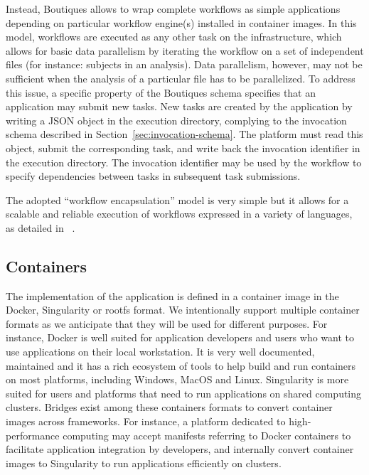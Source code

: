 \documentclass{article}
\newcommand{\todo}[2]{\pdfmargincomment[color=red,author=#1,open=true]{#2}}
\begin{document}
Instead, Boutiques allows to wrap complete workflows as simple
applications depending on particular workflow engine(s) installed in
container images. In this model, workflows are executed as any other
task on the infrastructure, which allows for basic data parallelism by
iterating the workflow on a set of independent files (for instance:
subjects in an analysis). Data parallelism, however, may not be
sufficient when the analysis of a particular file has to be
parallelized. To address this issue, a specific property of the
Boutiques schema specifies that an application may submit new
tasks. New tasks are created by the application by writing a JSON
object in the execution directory, complying to the invocation schema
described in Section~\ref{sec:invocation-schema}. The platform must
read this object, submit the corresponding task, and write back the
invocation identifier in the execution directory. The invocation
identifier may be used by the workflow to specify dependencies between
tasks in subsequent task submissions.

The adopted ``workflow encapsulation'' model is very simple but it
allows for a scalable and reliable execution of workflows expressed in
a variety of languages, as detailed in ~\cite{glatard2016fgcs}.


\subsection{Containers}

The implementation of the application is defined in a container image
in the Docker, Singularity or rootfs format. We intentionally support
multiple container formats as we anticipate that they will be used for
different purposes. For instance, Docker is well suited for
application developers and users who want to use applications on their
local workstation. It is very well documented, maintained and it has a
rich ecosystem of tools to help build and run containers on most
platforms, including Windows, MacOS and Linux. Singularity is more
suited for users and platforms that need to run applications on shared
computing clusters. Bridges exist among these containers formats to
convert container images across frameworks. For instance, a platform
dedicated to high-performance computing may accept manifests referring
to Docker containers to facilitate application integration by
developers, and internally convert container images to Singularity to
run applications efficiently on clusters.
\end{document}
